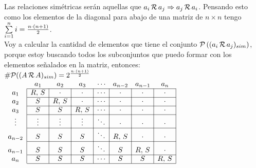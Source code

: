 \documentclass[12pt,a4paper, spanish]{article}
\begin{document}
Las relaciones simétricas serán aquellas que $a_i \,\mathcal{R}\, a_j \Rightarrow a_j \,\mathcal{R}\, a_i$. Pensando esto como los elementos de la diagonal
para abajo de una matriz de $n\times n$ tengo $\sum\limits_{i=1}^{n} i = \frac{n \cdot (n+1)}{2}$.\\
Voy a calcular la cantidad de elementos que tiene el conjunto $\mathcal P \left(  (a_i \,\mathcal{R}\, a_j)_{sim}  \right)$, porque estoy buscando todos los
subconjuntos que puedo formar con los elementos señalados en la matriz, entonces:\\
$ \#\mathcal P((A \,\mathcal{R}\, A)_{sim}) = 2^{\frac{n \cdot (n+1)}{2}}$\\
$
	\begin{array}{c|c|c|c|c|c|c|c|}
		\multicolumn{1}{c}{} & \multicolumn{1}{c}{a_1} & \multicolumn{1}{c}{a_2} & \multicolumn{1}{c}{a_3} & \multicolumn{1}{c}{\cdots} & \multicolumn{1}{c}{a_{n-2}} & \multicolumn{1}{c}{a_{n-1}} & \multicolumn{1}{c}{a_n} \\ \cline{2-8}
		a_1                  & R,\, S                  & \cdot                   & \cdot                   & \cdots                     & \cdot                       & \cdot                       & \cdot                   \\ \cline{2-8}
		a_2                  & S                       & R,\, S                  & \cdot                   & \cdots                     & \cdot                       & \cdot                       & \cdot                   \\ \cline{2-8}
		a_3                  & S                       & S                       & R,\, S                  & \cdots                     & \cdot                       & \cdot                       & \cdot                   \\ \cline{2-8}
		\vdots               & \vdots                  & \vdots                  & \vdots                  & \ddots                     & \cdot                       & \cdot                       & \cdot                   \\ \cline{2-8}
		a_{n-2}              & S                       & S                       & S                       & \ddots                     & R,\, S                      & \cdot                       & \cdot                   \\ \cline{2-8}
		a_{n-1}              & S                       & S                       & S                       & \ddots                     & S                           & R,\, S                      & \cdot                   \\ \cline{2-8}
		a_n                  & S                       & S                       & S                       & \cdots                     & S                           & S                           & R,\, S                  \\ \cline{2-8}
	\end{array}
$\\
\end{document}
